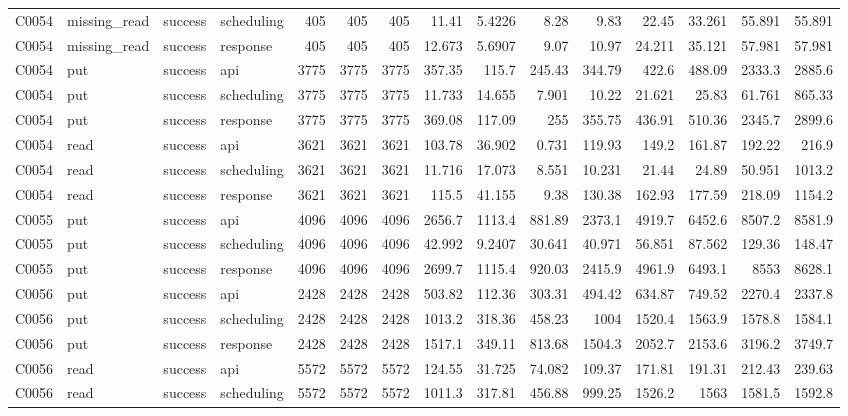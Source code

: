 \begin{landscape}
\begin{longtable}{llllrrrrrrrrrrr}
C0054 & missing\_\allowbreak{}read & success & scheduling & 405 & 405 & 405 & 11.41 & 5.4226 & 8.28 & 9.83 & 22.45 & 33.261 & 55.891 & 55.891\\
C0054 & missing\_\allowbreak{}read & success & response & 405 & 405 & 405 & 12.673 & 5.6907 & 9.07 & 10.97 & 24.211 & 35.121 & 57.981 & 57.981\\
C0054 & put & success & api & 3775 & 3775 & 3775 & 357.35 & 115.7 & 245.43 & 344.79 & 422.6 & 488.09 & 2333.3 & 2885.6\\
C0054 & put & success & scheduling & 3775 & 3775 & 3775 & 11.733 & 14.655 & 7.901 & 10.22 & 21.621 & 25.83 & 61.761 & 865.33\\
C0054 & put & success & response & 3775 & 3775 & 3775 & 369.08 & 117.09 & 255 & 355.75 & 436.91 & 510.36 & 2345.7 & 2899.6\\
C0054 & read & success & api & 3621 & 3621 & 3621 & 103.78 & 36.902 & 0.731 & 119.93 & 149.2 & 161.87 & 192.22 & 216.9\\
C0054 & read & success & scheduling & 3621 & 3621 & 3621 & 11.716 & 17.073 & 8.551 & 10.231 & 21.44 & 24.89 & 50.951 & 1013.2\\
C0054 & read & success & response & 3621 & 3621 & 3621 & 115.5 & 41.155 & 9.38 & 130.38 & 162.93 & 177.59 & 218.09 & 1154.2\\
C0055 & put & success & api & 4096 & 4096 & 4096 & 2656.7 & 1113.4 & 881.89 & 2373.1 & 4919.7 & 6452.6 & 8507.2 & 8581.9\\
C0055 & put & success & scheduling & 4096 & 4096 & 4096 & 42.992 & 9.2407 & 30.641 & 40.971 & 56.851 & 87.562 & 129.36 & 148.47\\
C0055 & put & success & response & 4096 & 4096 & 4096 & 2699.7 & 1115.4 & 920.03 & 2415.9 & 4961.9 & 6493.1 & 8553 & 8628.1\\
C0056 & put & success & api & 2428 & 2428 & 2428 & 503.82 & 112.36 & 303.31 & 494.42 & 634.87 & 749.52 & 2270.4 & 2337.8\\
C0056 & put & success & scheduling & 2428 & 2428 & 2428 & 1013.2 & 318.36 & 458.23 & 1004 & 1520.4 & 1563.9 & 1578.8 & 1584.1\\
C0056 & put & success & response & 2428 & 2428 & 2428 & 1517.1 & 349.11 & 813.68 & 1504.3 & 2052.7 & 2153.6 & 3196.2 & 3749.7\\
C0056 & read & success & api & 5572 & 5572 & 5572 & 124.55 & 31.725 & 74.082 & 109.37 & 171.81 & 191.31 & 212.43 & 239.63\\
C0056 & read & success & scheduling & 5572 & 5572 & 5572 & 1011.3 & 317.81 & 456.88 & 999.25 & 1526.2 & 1563 & 1581.5 & 1592.8\\

\end{longtable}
\end{landscape}
